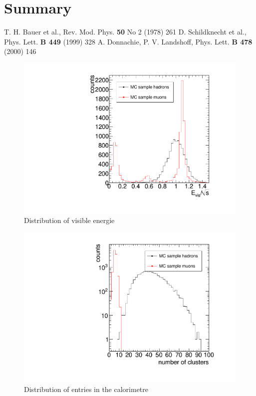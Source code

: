 \documentclass[epj,nopacs]{svjour}
\begin{document}
\section{ Summary}

\begin{thebibliography}{}
\baselineskip=0.38cm
 T. H. Bauer et al., Rev. Mod. Phys. \textbf{50} No 2 (1978) 261  
D. Schildknecht et al., Phys. Lett. \textbf{B 449} (1999) 328
A. Donnachie, P. V. Landshoff, Phys. Lett. \textbf{B 478} (2000) 146

\end{thebibliography}

\begin{figure}[htb]
 \centering
 \includegraphics[width=1\columnwidth,keepaspectratio]{E_vis}
 \caption{Distribution of visible energie}
 \label{fig:e_vis}
\end{figure}

\begin{figure}[htb]
 \centering
 \includegraphics[width=1\columnwidth,keepaspectratio]{N_Cluster}
 \caption{Distribution of entries in the calorimetre}
 \label{fig:n_cluster}
\end{figure}
\end{document}
